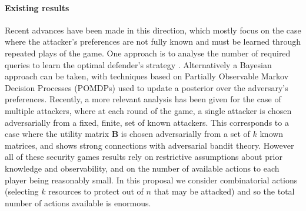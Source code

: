 \paragraph{Existing results}
Recent advances have been made in this direction, which mostly focus on the case where the attacker's preferences are not fully known and must be learned through repeated plays of the game. One approach is to analyse the number of required queries to learn the optimal defender's strategy \cite{blum2014learning, letchford2009learning}. 
Alternatively a Bayesian approach can be taken, with techniques based on Partially Observable Markov Decision Processes (POMDPs) used to update a posterior over the adversary's preferences\cite{Marecki12PR, qian2014online}. 
Recently, a more relevant analysis has been given\cite{Balcan15CR} for the case of multiple attackers, where at each round of the game, a single attacker is chosen adversarially from a fixed, finite, set of known attackers. This corresponds to a case where the utility matrix $\boldsymbol B$ is chosen adversarially from a set of $k$ known matrices, and shows strong connections with adversarial bandit theory.  However all of these security games results rely on restrictive assumptions about prior knowledge and observability, and on the number of available actions to each player being reasonably small.  In this proposal we consider combinatorial actions (selecting $k$ resources to protect out of $n$ that may be attacked) and so the total number of actions available is enormous.

